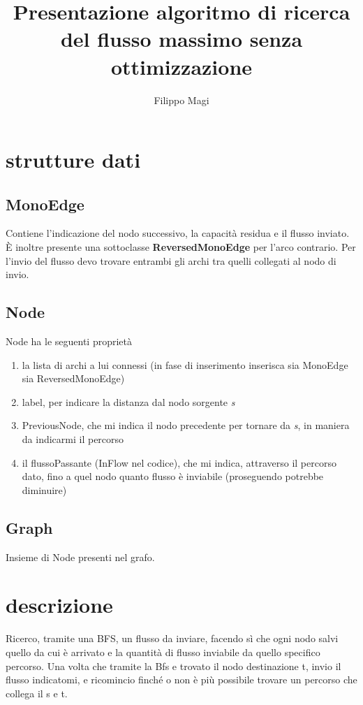 \documentclass{article}
\title{Presentazione algoritmo di ricerca del flusso massimo senza ottimizzazione}
\author{Filippo Magi }
\begin{document}
\maketitle

\section{strutture dati}
\subsection{MonoEdge}

Contiene l'indicazione del nodo successivo, la capacità residua e il flusso inviato.
È inoltre presente una sottoclasse \textbf{ReversedMonoEdge} per l'arco contrario.
Per l'invio del flusso devo trovare entrambi gli archi tra quelli collegati al nodo di invio.

\subsection{Node}

Node ha le seguenti proprietà
\begin{enumerate}
    \item la lista di archi a lui connessi (in fase di inserimento inserisca sia MonoEdge sia ReversedMonoEdge)
    \item label, per indicare la distanza dal nodo sorgente \textit{s}
    \item PreviousNode, che mi indica il nodo precedente per tornare da \textit{s}, in maniera da indicarmi il percorso
    \item il flussoPassante (InFlow nel codice), che mi indica, attraverso il percorso dato, fino a quel nodo quanto flusso è inviabile (proseguendo potrebbe diminuire)
\end{enumerate}

\subsection {Graph}

Insieme di Node presenti nel grafo.

\section{descrizione}

Ricerco, tramite una BFS, un flusso da inviare, facendo sì che ogni nodo salvi quello da cui è arrivato e la quantità di flusso inviabile da quello specifico percorso.
Una volta che tramite la Bfs e trovato il nodo destinazione t, invio il flusso indicatomi, e ricomincio finché o non è più possibile trovare un percorso che collega il s e t.
\end{document}
